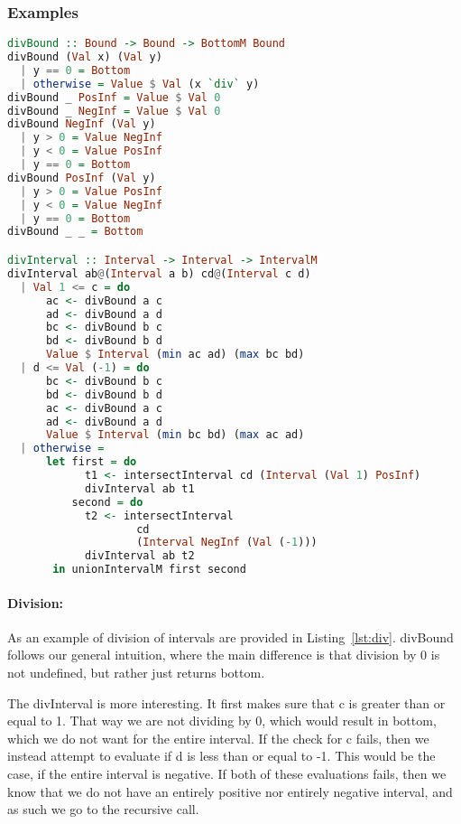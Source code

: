 \subsubsection*{Examples}
\begin{lstlisting}[language={haskell}, caption={Full division implementation}, label={lst:div}]
divBound :: Bound -> Bound -> BottomM Bound
divBound (Val x) (Val y)
  | y == 0 = Bottom
  | otherwise = Value $ Val (x `div` y)
divBound _ PosInf = Value $ Val 0
divBound _ NegInf = Value $ Val 0
divBound NegInf (Val y)
  | y > 0 = Value NegInf
  | y < 0 = Value PosInf
  | y == 0 = Bottom
divBound PosInf (Val y)
  | y > 0 = Value PosInf
  | y < 0 = Value NegInf
  | y == 0 = Bottom
divBound _ _ = Bottom

divInterval :: Interval -> Interval -> IntervalM
divInterval ab@(Interval a b) cd@(Interval c d)
  | Val 1 <= c = do
      ac <- divBound a c
      ad <- divBound a d
      bc <- divBound b c
      bd <- divBound b d
      Value $ Interval (min ac ad) (max bc bd)
  | d <= Val (-1) = do
      bc <- divBound b c
      bd <- divBound b d
      ac <- divBound a c
      ad <- divBound a d
      Value $ Interval (min bc bd) (max ac ad)
  | otherwise =
      let first = do
            t1 <- intersectInterval cd (Interval (Val 1) PosInf)
            divInterval ab t1
          second = do
            t2 <- intersectInterval 
                    cd
                    (Interval NegInf (Val (-1)))
            divInterval ab t2
       in unionIntervalM first second
\end{lstlisting}  
\paragraph{Division:}
As an example of division of intervals are provided in Listing~\ref{lst:div}.
divBound follows our general intuition, where the main difference is that
division by 0 is not undefined, but rather just returns bottom. 

The divInterval is more interesting. It first makes sure that c is greater than
or equal to 1. That way we are not dividing by 0, which would result in bottom,
which we do not want for the entire interval. If the check for c fails, then we
instead attempt to evaluate if d is less than or equal to -1. This would be the
case, if the entire interval is negative. If both of these evaluations fails,
then we know that we do not have an entirely positive nor entirely negative
interval, and as such we go to the recursive call. 

